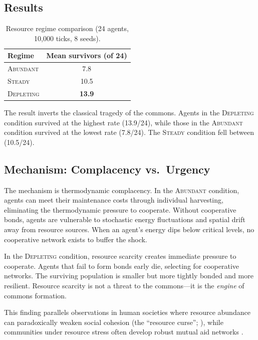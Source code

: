 \documentclass[12pt,a4paper]{article}
\begin{document}
\subsection{Results}

\begin{table}[H]
\centering
\caption{Resource regime comparison (24 agents, 10{,}000 ticks, 8 seeds).}
\label{tab:commons}
\begin{tabular}{@{}lc@{}}
\toprule
\textbf{Regime} & \textbf{Mean survivors (of 24)} \\
\midrule
\textsc{Abundant}  & 7.8   \\
\textsc{Steady}    & 10.5  \\
\textsc{Depleting} & \textbf{13.9} \\
\bottomrule
\end{tabular}
\end{table}

The result inverts the classical tragedy of the commons. Agents in the \textsc{Depleting} condition survived at the highest rate (13.9/24), while those in the \textsc{Abundant} condition survived at the lowest rate (7.8/24). The \textsc{Steady} condition fell between (10.5/24).

\subsection{Mechanism: Complacency vs.\ Urgency}

The mechanism is thermodynamic complacency. In the \textsc{Abundant} condition, agents can meet their maintenance costs through individual harvesting, eliminating the thermodynamic pressure to cooperate. Without cooperative bonds, agents are vulnerable to stochastic energy fluctuations and spatial drift away from resource sources. When an agent's energy dips below critical levels, no cooperative network exists to buffer the shock.

In the \textsc{Depleting} condition, resource scarcity creates immediate pressure to cooperate. Agents that fail to form bonds early die, selecting for cooperative networks. The surviving population is smaller but more tightly bonded and more resilient. Resource scarcity is not a threat to the commons---it is the \emph{engine} of commons formation.

This finding parallels observations in human societies where resource abundance can paradoxically weaken social cohesion (the ``resource curse''; \citealt{ross2015}), while communities under resource stress often develop robust mutual aid networks \citep{kropotkin1902}.
\end{document}
